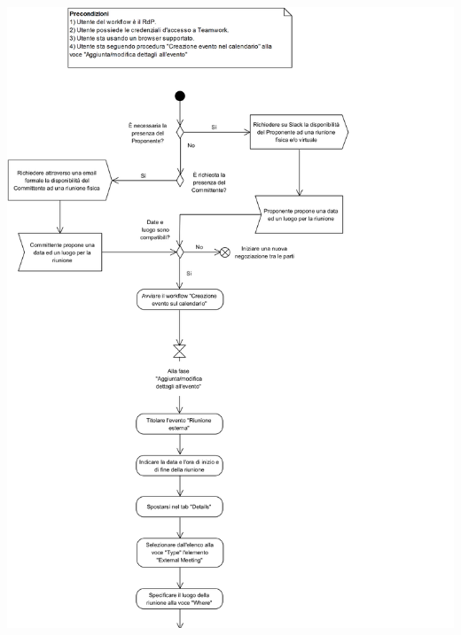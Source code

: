 \begin{center}
	\includegraphics[width=14cm]{./DiagrammiProcedure/RiunioneEsterna1.png}
\end{center}


